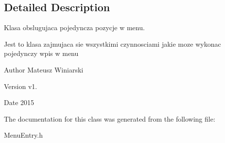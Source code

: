 \subsection{Detailed Description}
Klasa obslugujaca pojedyncza pozycje w menu. 

Jest to klasa zajmujaca sie wszystkimi czynnosciami jakie moze wykonac pojedynczy wpis w menu \begin{DoxyAuthor}{Author}
Mateusz Winiarski 
\end{DoxyAuthor}
\begin{DoxyVersion}{Version}
v1. 
\end{DoxyVersion}
\begin{DoxyDate}{Date}
2015 
\end{DoxyDate}


The documentation for this class was generated from the following file\+:\begin{DoxyCompactItemize}
\item 
Menu\+Entry.\+h\end{DoxyCompactItemize}
